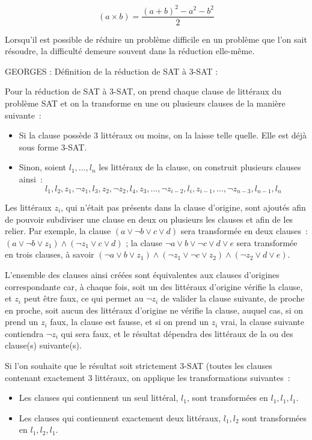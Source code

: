 \documentclass{article}
\begin{document}
$$(a \times b) = \dfrac{(a + b)^2 - a^2 - b^2}{2}$$


Lorsqu'il est possible de réduire un problème difficile en un problème que l'on sait résoudre, la difficulté demeure souvent dans la réduction elle-même.

GEORGES : Définition de la réduction de SAT à 3-SAT :

Pour la réduction de SAT à 3-SAT, on prend chaque clause de littéraux du problème SAT et on la transforme en une ou plusieurs clauses de la manière suivante~:

\begin{itemize}
\item Si la clause possède 3 littéraux ou moins, on la laisse telle quelle. Elle est déjà sous forme 3-SAT.
\item Sinon, soient $l_1, \dots, l_n$ les littéraux de la clause, on construit plusieurs clauses ainsi~:
$$
{l_1, l_2, z_1}, {\lnot z_1, l_3, z_2}, {\lnot z_2, l_4, z_3}, \dots, {\lnot z_{i-2}, l_{i}, z_{i-1}}, \dots, {\lnot z_{n-3}, l_{n-1}, l_{n}}
$$
\end{itemize}

Les littéraux $z_i$, qui n'était pas présents dans la clause d'origine, sont ajoutés afin de pouvoir subdiviser une clause en deux ou plusieurs les clauses et afin de les relier. Par exemple, la clause $(a \vee \lnot b \vee c \vee d)$ sera transformée en deux clauses~: $(a \vee \lnot b \vee z_1) \wedge (\lnot z_1 \vee c \vee d)$ ; la clause
${\lnot a \vee b \vee \lnot c \vee d \vee e}$ sera transformée en trois clauses, à savoir $(\lnot a \vee b \vee z_1) \wedge (\lnot z_1 \vee \lnot c \vee z_2) \wedge (\lnot z_2 \vee d \vee e)$.

L'ensemble des clauses ainsi créées sont équivalentes aux clauses d'origines correspondante car, à chaque fois, soit un des littéraux d'origine vérifie la clause, et $z_i$ peut être faux, ce qui permet au $\lnot z_i$ de valider la clause suivante, de proche en proche, soit aucun des littéraux d'origine ne vérifie la clause, auquel cas, si on prend un $z_i$ faux, la clause est fausse, et si on prend un $z_i$ vrai, la clause suivante contiendra
$\lnot z_i$ qui sera faux, et le résultat dépendra des littéraux de la ou des clause(s) suivante(s). 


Si l'on souhaite que le résultat soit strictement 3-SAT (toutes les clauses contenant exactement 3 littéraux, on applique les transformations suivantes~:
\begin{itemize}
\item Les clauses qui contiennent un seul littéral, ${l_1}$, sont transformées en ${l_1, l_1, l_1}$.
\item Les clauses qui contiennent exactement deux littéraux, ${l_1, l_2}$ sont transformées en ${l_1, l_2, l_1}$.
\end{itemize}
\end{document}
